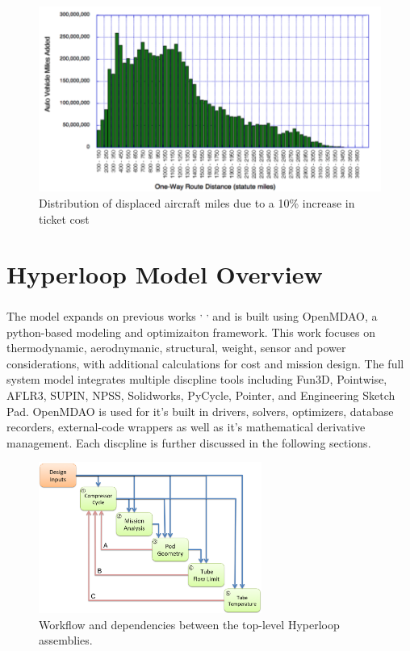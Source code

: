 \documentclass[heading.tex]{subfiles}
\begin{document}
\begin{figure}[hbtp]
\centering
\includegraphics[width=.75\textwidth]{images/price.png}
 \caption[price]{Distribution of displaced aircraft miles due to a 10\% increase in ticket cost}
\label{f:price}
\end{figure}


\section{Hyperloop Model Overview}

The model expands on previous works \cite{Chin} \textsuperscript{,}
\cite{goodwin2009cantera}\textsuperscript{,} \cite{GrayBenchmarking2013}
and is built using OpenMDAO, a python-based modeling and optimizaiton framework.
This work focuses on thermodynamic, aerodnymanic, structural,
weight, sensor and power considerations, with additional calculations for cost
and mission design. The full system model integrates multiple discpline tools
including Fun3D, Pointwise, AFLR3, SUPIN, NPSS, Solidworks, PyCycle, Pointer,
and Engineering Sketch Pad. OpenMDAO is used for it's built in drivers, solvers,
optimizers, database recorders, external-code wrappers as well as it's
mathematical derivative management. Each discpline is further discussed in the
following sections.

\label{s:struct}

\begin{figure}[hbtp]
\centering
\includegraphics[width=0.65\textwidth]{images/TopAssembly.png}
\caption{Workflow and dependencies between the top-level Hyperloop assemblies.}
\label{f:hyperloopXDSM}
\end{figure}
\end{document}
